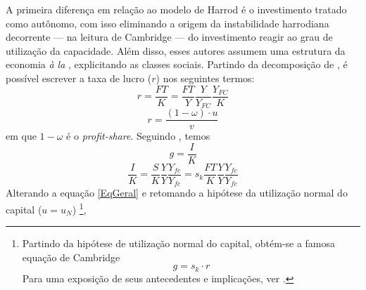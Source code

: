 A primeira diferença em relação ao modelo de Harrod é o investimento tratado como autônomo, com isso eliminando a origem da instabilidade harrodiana decorrente --- na leitura de Cambridge --- do investimento reagir ao grau de utilização da capacidade.
Além disso, esses autores assumem uma estrutura da economia \textit{à la} \textcite{kalecki_theory_1954}, explicitando as classes sociais. Partindo da decomposição de \textcite{weisskopf_marxian_1979}, é possível escrever a taxa de lucro ($r$) nos seguintes termos:
$$
r = \frac{FT}{K} = \frac{FT}{Y}\frac{Y}{Y_{FC}}\frac{Y_{FC}}{K}
$$ 
\begin{equation}
\label{LucroCambridge}
r = \frac{(1-\omega)\cdot u}{v}
\end{equation}
em que $1-\omega$ é o \textit{profit-share}. Seguindo \textcite{serrano_trouble_2017}, temos
$$
g = \frac{I}{K} 
$$
$$
\frac{I}{K} = \frac{S}{K}\frac{Y}{Y}\frac{Y_{fc}}{Y_{fc}} = s_k\frac{FT}{K}\frac{Y}{Y}\frac{Y_{fc}}{Y_{fc}}
$$
Alterando a equação \ref{EqGeral} e retomando a hipótese da utilização normal do capital ($u=u_N$)
\footnote{
	Partindo da hipótese de utilização normal do capital, obtém-se a famosa equação de Cambridge
	\begin{equation}
	\label{EqCambridge}
	g = s_k\cdot r
	\end{equation}
	Para uma exposição de seus antecedentes e implicações, ver \textcite{bortis_notes_1993}.
}, 
